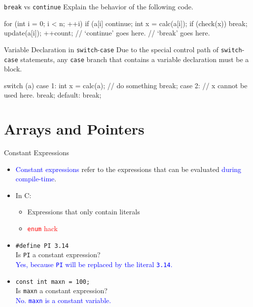\documentclass[handout]{beamer}
\newcommand{\red}[1]{\textcolor{red}{#1}}
\newcommand{\blue}[1]{\textcolor{blue}{#1}}
\newcommand{\ttt}[1]{\texttt{#1}}
\begin{document}
\begin{frame}[fragile]{\ttt{break} vs \ttt{continue}}
    Explain the behavior of the following code.
    \begin{cpp}
for (int i = 0; i < n; ++i) {
  if (a[i] %
    continue;
  int x = calc(a[i]);
  if (check(x))
    break;
  update(a[i]);
  ++count;
  // `continue' goes here.
}
// `break' goes here.
    \end{cpp}
\end{frame}

\begin{frame}[fragile]{Variable Declaration in \ttt{switch}-\ttt{case}}
    Due to the special control path of \ttt{switch}-\ttt{case} statements, any \ttt{case} branch that contains a variable declaration must be a block.
    \begin{cpp}
switch (a) {
  case 1: {
    int x = calc(a);
    // do something
    break;
  }
  case 2:
    // x cannot be used here.
    break;
  default:
    break;
}
    \end{cpp}
\end{frame}

\section{Arrays and Pointers}

\begin{frame}[fragile]{Constant Expressions}
	\begin{itemize}
		\item \blue{Constant expressions} refer to the expressions that can be evaluated \blue{during compile-time}.
		\item In C:
		\begin{itemize}
			\item Expressions that only contain literals
			\item \red{\ttt{enum} hack}
		\end{itemize}
		\pause
		\item \ttt{\#define PI 3.14}\\
		Is \ttt{PI} a constant expression?\\
		\pause
		\blue{Yes, because \ttt{PI} will be replaced by the literal \ttt{3.14}.}
		\pause
		\item \ttt{const int maxn = 100;}\\
		Is \ttt{maxn} a constant expression?\\
		\pause
		\blue{No. \ttt{maxn} is a constant variable.}
	\end{itemize}
\end{frame}
\end{document}
